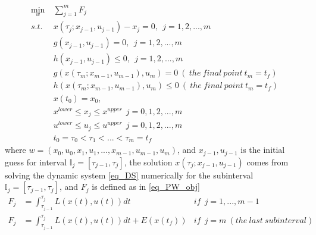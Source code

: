 \documentclass  [
  paper    = a4,
  BCOR     = 10mm,
  twoside,
  fontsize = 12pt,
  fleqn,
  toc      = bibnumbered,
  toc      = listofnumbered,
  numbers  = noendperiod,
  headings = normal,
  listof   = leveldown,
  version  = 3.03
]                                       {scrreprt}
\newcommand{\<}{\langle}
\renewcommand{\>}{\rangle}
\begin{document}
	\begin{subequations}
	\begin{align}
		\underset{w}{\text{min}}   \ &  \sum_{j=1}^{m} F_j   \label{P3_obj}   \\
		s.t. \ \ & x(\tau_j; x_{j-1}, u_{j-1}) - x_j = 0,   \ \ j = 1, 2, ...,m  \label{P3_eq}  \\
		 &  g(x_{j-1}, u_{j-1}) = 0,     \ \ j = 1, 2, ...,m \\
		 & h(x_{j-1}, u_{j-1}) \leq 0,    \ \ j = 1, 2, ...,m     \\
		 		&  g(x(\tau_m; x_{m-1}, u_{m-1}), u_m) = 0  \ (\ the \ final\  point\  t_m=t_f) \\
		 & h(x(\tau_m; x_{m-1}, u_{m-1}), u_m) \leq 0  \ (\ the \ final\  point \ t_m=t_f) \\
		 &  x(t_0) = x_0,  \\
		 & x^{lower} \leq x_j \leq x^{upper}  \ \ j = 0, 1, 2, ...,m  \\
		 & u^{lower} \leq u_j \leq u^{upper}  \ \ j =0,  1, 2, ...,m \\
		         &   t_0 = \tau_0 < \tau_1 < ... < \tau_m = t_f 
	\end{align}
	\label{P3_MSNLP}
\end{subequations}  
where $w = (x_0, u_0, x_1, u_1, ..., x_{m-1}, u_{m-1}, u_m) $, and $x_{j-1}, u_{j-1}$ is the initial guess  for interval $\mathbb{I}_j = [\tau_{j-1}, \tau_j]$, the  solution  $x(\tau_j; x_{j-1}, u_{j-1})$ comes from solving the dynamic system \ref{eq_DS} numerically for the subinterval $\mathbb{I}_j = [\tau_{j-1}, \tau_j]$,  and $F_j$ is defined as in \ref{eq_PW_obj}
\begin{equation}\label{eq_PW_obj}
	\begin{aligned}
		F_j &= \int_{\tau_{j-1}}^{\tau_j}L(x(t), u(t))dt   &if \ \   j= 1, ..., m-1 \\ 
		F_j  & = \int_{\tau_{j-1}}^{\tau_j}L(x(t), u(t))dt + E (x(t_f)) &if\ \   j =m  \ (the\  last\  subinterval)
	\end{aligned}
\end{equation}


\end{document}
